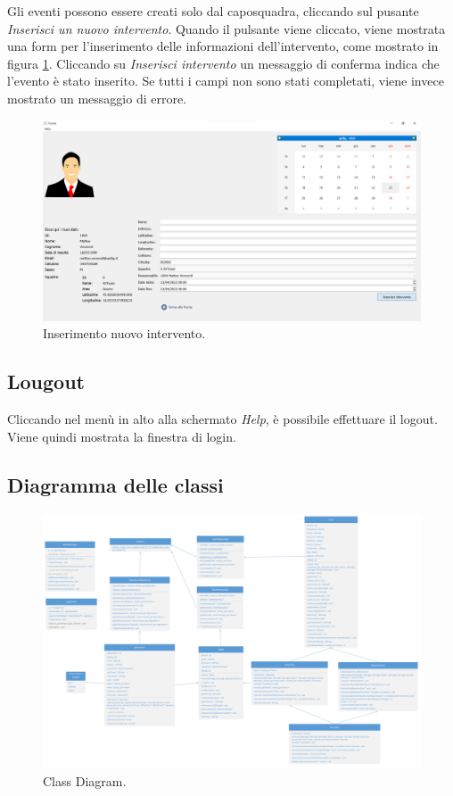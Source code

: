 Gli eventi possono essere creati solo dal caposquadra, cliccando sul pusante \textit{Inserisci un nuovo intervento}.
Quando il pulsante viene cliccato, viene mostrata una form per l'inserimento delle informazioni dell'intervento, come mostrato in figura \ref{fig:new_op}. Cliccando su \textit{Inserisci intervento} un messaggio di conferma indica che l'evento è stato inserito. Se tutti i campi non sono stati completati, viene invece mostrato un messaggio di errore.
\begin{figure}[h!]
	\centering
	\includegraphics[width=1\linewidth]{./ImageFiles/new_op.png}
	\caption{Inserimento nuovo intervento.}
	\label{fig:new_op}
\end{figure}

\subsection{Lougout}
Cliccando nel menù in alto alla schermato \textit{Help}, è possibile effettuare il logout. Viene quindi mostrata la finestra di login.

\begin{landscape}
	\section{Diagramma delle classi}
	\begin{figure}[h!]
		\centering
		\includegraphics[width=0.9\linewidth]{./OtherFiles/Class Diagram}
		\caption{Class Diagram.}
		\label{fig:class_diagram}
	\end{figure}
\end{landscape}

